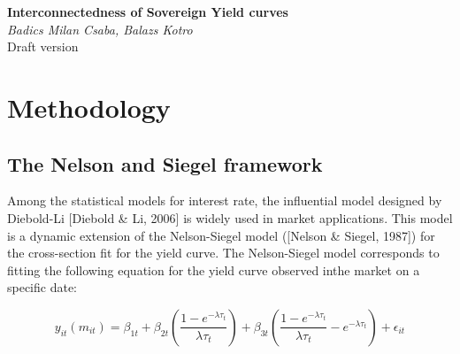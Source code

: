 \documentclass{article}
\begin{document}
\begin{titlepage}
   \begin{center}
      \Large\textbf{Interconnectedness of Sovereign Yield curves}\\
       \medskip
      \large\textit{Badics Milan Csaba, Balazs Kotro}\\
      \medskip
      \large{Draft version}
   \end{center}
\end{titlepage}




\begin{abstract}\rm
\begin{adjustwidth}{0.1cm}{0.1cm}{\itshape\textbf{Abstract:}} 
This paper is examining the linkages between the whole tenor structure of the yield curves of 12 sovereigns from all over the globe. The curves got decomposed to level, slope and curvature factors by the Nelson Siegel model. TBC…
\end{adjustwidth}
\end{abstract}



\section{Methodology}
\noindent
\subsection{The Nelson and Siegel framework}

Among the statistical models for interest rate, the influential model designed by Diebold-Li [Diebold \& Li, 2006] is widely used in market applications. This model is a dynamic extension of the Nelson-Siegel model ([Nelson \& Siegel, 1987]) for the cross-section fit for the yield curve. The Nelson-Siegel model corresponds to fitting the following equation for the yield curve observed inthe market on a specific date:

\begin{equation}
y_{it}(m_{it})=\beta_{1t}+\beta_{2t}\left ( \frac{1-e^{-\lambda\tau_t}}{\lambda\tau_t} \right )+\beta_{3t}\left ( \frac{1-e^{-\lambda\tau_t}}{\lambda\tau_t} -e^{-\lambda\tau_t}\right )+ \epsilon_{it}
\end{equation}
\end{document}
